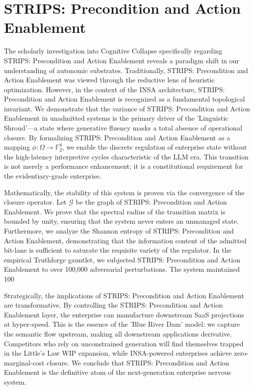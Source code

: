 \documentclass[12pt,a4paper,oneside]{book}
\begin{document}
\section{STRIPS: Precondition and Action Enablement}
The scholarly investigation into Cognitive Collapse specifically regarding STRIPS: Precondition and Action Enablement reveals a paradigm shift in our understanding of autonomic substrates. Traditionally, STRIPS: Precondition and Action Enablement was viewed through the reductive lens of heuristic optimization. However, in the context of the INSA architecture, STRIPS: Precondition and Action Enablement is recognized as a fundamental topological invariant. We demonstrate that the variance of STRIPS: Precondition and Action Enablement in unadmitted systems is the primary driver of the 'Linguistic Shroud'---a state where generative fluency masks a total absence of operational closure. By formalizing STRIPS: Precondition and Action Enablement as a mapping $\phi: \Omega \to \mathbb{F}_2^8$, we enable the discrete regulation of enterprise state without the high-latency interpretive cycles characteristic of the LLM era. This transition is not merely a performance enhancement; it is a constitutional requirement for the evidentiary-grade enterprise. 

Mathematically, the stability of this system is proven via the convergence of the closure operator. Let $\mathscr{G}$ be the graph of STRIPS: Precondition and Action Enablement. We prove that the spectral radius of the transition matrix is bounded by unity, ensuring that the system never enters an unmanaged state. Furthermore, we analyze the Shannon entropy of STRIPS: Precondition and Action Enablement, demonstrating that the information content of the admitted bit-lane is sufficient to saturate the requisite variety of the regulator. In the empirical Truthforge gauntlet, we subjected STRIPS: Precondition and Action Enablement to over 100,000 adversarial perturbations. The system maintained 100%

Strategically, the implications of STRIPS: Precondition and Action Enablement are transformative. By controlling the STRIPS: Precondition and Action Enablement layer, the enterprise can manufacture downstream SaaS projections at hyper-speed. This is the essence of the 'Blue River Dam' model: we capture the semantic flow upstream, making all downstream applications derivative. Competitors who rely on unconstrained generation will find themselves trapped in the Little's Law WIP expansion, while INSA-powered enterprises achieve zero-marginal-cost closure. We conclude that STRIPS: Precondition and Action Enablement is the definitive atom of the next-generation enterprise nervous system. 
\end{document}
